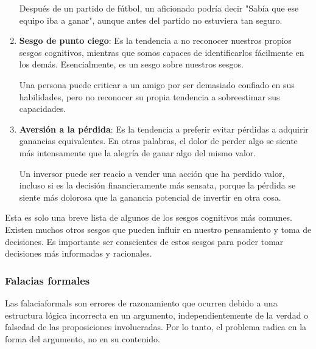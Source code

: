 \begin{enumerate}
	\begin{example}
		Después de un partido de fútbol, un aficionado podría decir "Sabía que ese equipo iba a ganar", aunque antes del partido no estuviera tan seguro.
	\end{example}
	
	\item \textbf{Sesgo de punto ciego}: Es la tendencia a no reconocer nuestros propios sesgos cognitivos, mientras que somos capaces de identificarlos fácilmente en los demás. Esencialmente, es un sesgo sobre nuestros sesgos.
	
	\begin{example}
		Una persona puede criticar a un amigo por ser demasiado confiado en sus habilidades, pero no reconocer su propia tendencia a sobreestimar sus capacidades.
	\end{example}
	
	\item \textbf{Aversión a la pérdida}: Es la tendencia a preferir evitar pérdidas a adquirir ganancias equivalentes. En otras palabras, el dolor de perder algo se siente más intensamente que la alegría de ganar algo del mismo valor.
	
	\begin{example}
		Un inversor puede ser reacio a vender una acción que ha perdido valor, incluso si es la decisión financieramente más sensata, porque la pérdida se siente más dolorosa que la ganancia potencial de invertir en otra cosa.
	\end{example}
\end{enumerate}

\begin{lgnote}
	Esta es solo una breve lista de algunos de los sesgos cognitivos más comunes. Existen muchos otros sesgos que pueden influir en nuestro pensamiento y toma de decisiones. Es importante ser conscientes de estos sesgos para poder tomar decisiones más informadas y racionales.
\end{lgnote}

\subsubsection{Falacias formales}
\vspace{1em} 
\begin{fmd-definition}
Las \glspl{falaciaformal} son errores de razonamiento que ocurren debido a una estructura lógica incorrecta en un argumento, independientemente de la verdad o falsedad de las proposiciones involucradas. Por lo tanto, el problema radica en la forma del argumento, no en su contenido.
\end{fmd-definition}

